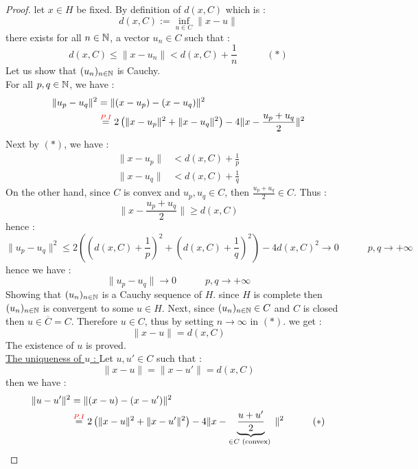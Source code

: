 \begin{proof}
let $x \in  H$ be fixed. By definition 
of $d(x,C)$ which is : 
\[
d(x,C)  := \inf_{u \in  C} \| x-u \| 
\]
there exists for all $n \in \mathbb{N}$, a vector 
$u_{n} \in C $  such that : 
\[
d(x, C)  \leq 
\| x - u_{n} \|  <  
d(x, C)  + \frac{1}{n} \quad \quad 
\quad (*) 
\]
Let us show that $(u_{n}) _{n \in  \mathbb{N}} $  is 
Cauchy. \\
For all $p,q \in \mathbb{N} $, we have : 
\begin{align*}
\| u_{p} - u_{q} \|  ^2  
&= 
\| (x- u_{p}) - (x-u_{q})  \|  ^2  
\\
&\overset{ \textcolor{red}{P.I}}{=}     
2 \left( 
  \| x-u_{p} \| ^2  + 
  \| x-u_{q} \|  ^2  
\right) - 4 
\| x - \frac{u_{p} + u_{q}}{2} \|  ^2 
\end{align*}
Next by $(*)$, we have : 
\begin{align*}
  \| x - u_{p} \|  & < 
  d(x, C) + \frac{1}{p} \\
  \| x-u_{q} \| & <  
  d(x, C)  + \frac{1}{q}
\end{align*}
On the other hand, since $C $ 
is convex and $u_{p}, u_{q} \in  C $, then 
$\frac{u_{p} + u_{q}}{2} \in C $. Thus : 
\[
\| x-  \frac{u_{p} + u_{q}}{2} \|  
\geq d(x,C) 
\]
hence : 
\[
\| u_{p} - u_{q} \| ^2  
\leq 2 \left( 
  (d(x,C) + \frac{1}{p}) ^2  + 
  (d(x, C) + \frac{1}{q}) ^2 
\right) - 4 d(x,C) ^2  \rightarrow  0
\quad \quad \quad 
p,q \rightarrow +\infty 
\]
hence we have : 
\[
\| u_{p} - u_{q} \|  \rightarrow 0 \quad 
\quad \quad 
p,q \rightarrow + \infty 
\]
Showing that $(u_{n}) _{n \in \mathbb{N}} $ is a 
Cauchy sequence of $H$. since $H $ is complete
then $(u_{n}) _{n \in \mathbb{N}} $  
is convergent to some $u \in  H $. Next, 
since $(u_{n}) _{n \in \mathbb{N}} \in C $ and $C $ 
is closed then $u \in  \overline{C} = C $. Therefore
$u \in  C$, thus by setting 
$n \rightarrow \infty  $ in $(*)$. we get : 
\[
\| x-u \| = d(x,C) 
\]
The existence of $u $ is proved.  \\ 
\underline{
The uniqueness of $u $ :
}
Let $u, u'  \in C $ such that : 
\[
\| x-u \|  = \| x-u' \|  = 
d(x,C) 
\]
then we have : 
\begin{align*}
  \| u-u' \|^2   &= 
\| (x-u) -(x-u') \| ^2  
\\
                 & \overset{\textcolor{red}{P.I}}{=}  
              2 \left( 
                \| x-u \| ^2  + 
                \| x-u' \| ^2 
              \right) - 
              4 \| x-
              \underbrace{
              \frac{u + u'}{2} 
              }_{ \in  C \text{ (convex) } } 
              \| ^2  \quad  \quad  \quad  (*) 

\end{align*}
\end{proof}
